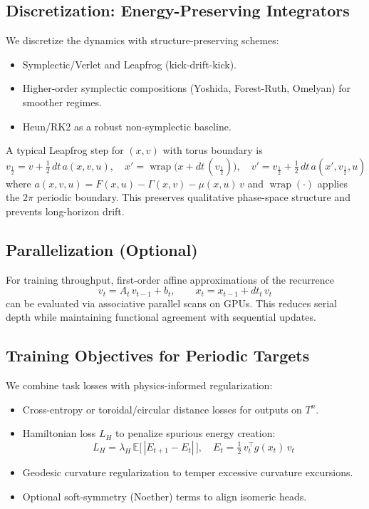 \documentclass{article}
\numberwithin{equation}{section}
\begin{document}
\subsection{Discretization: Energy-Preserving Integrators}
We discretize the dynamics with structure-preserving schemes:
\begin{itemize}
\item Symplectic/Verlet and Leapfrog (kick-drift-kick).
\item Higher-order symplectic compositions (Yoshida, Forest-Ruth, Omelyan) for smoother regimes.
\item Heun/RK2 as a robust non-symplectic baseline.
\end{itemize}
A typical Leapfrog step for $(x,v)$ with torus boundary is
\[
v_{\tfrac12} = v + \tfrac12\,dt\,a(x,v,u),\quad
x' = \operatorname{wrap}\big(x + dt\,(v_{\tfrac12})\big),\quad
v' = v_{\tfrac12} + \tfrac12\,dt\,a(x',v_{\tfrac12},u)
\]
where $a(x,v,u) = F(x,u) - \Gamma(x,v) - \mu(x,u)\,v$ and $\operatorname{wrap}(\cdot)$ applies the $2\pi$ periodic boundary. This preserves qualitative phase-space structure and prevents long-horizon drift.

\subsection{Parallelization (Optional)}
For training throughput, first-order affine approximations of the recurrence
\[
v_t = A_t\,v_{t-1} + b_t,\qquad
x_t = x_{t-1} + dt_t\,v_t
\]
can be evaluated via associative parallel scans on GPUs. This reduces serial depth while maintaining functional agreement with sequential updates.

\subsection{Training Objectives for Periodic Targets}
We combine task losses with physics-informed regularization:
\begin{itemize}
\item Cross-entropy or toroidal/circular distance losses for outputs on $T^n$.
\item Hamiltonian loss $L_H$ to penalize spurious energy creation:
\[
L_H = \lambda_H\,\mathbb{E}\big[\,|E_{t+1} - E_t|\,\big],\quad
E_t = \tfrac12\,v_t^\top g(x_t)\,v_t
\]
\item Geodesic curvature regularization to temper excessive curvature excursions.
\item Optional soft-symmetry (Noether) terms to align isomeric heads.
\end{itemize}
\end{document}

